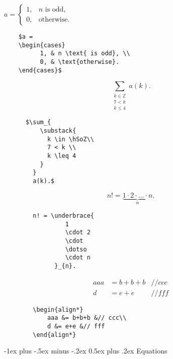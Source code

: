 \documentclass[a4paper,10pt,landscape]{article}
\makeatletter
\renewcommand{\section}{\@startsection{section}{1}{0mm}%
	                                {-1ex plus -.5ex minus -.2ex}%
	                                {0.5ex plus .2ex}%
	                                {\normalfont\large\bfseries}}
\theoremstyle{definition}
\theoremstyle{remark}
\newcommand{\hSoZ}  {\ensuremath{\mathbb{Z}}}      %
\makeatother
\begin{document}
\begin{multicols}{3}
\begin{multicols}{2}
	$a = 
	\begin{cases}
		1, & n \text{ is odd}, \\
		0, & \text{otherwise}.
	\end{cases}$
\columnbreak
	\begin{verbatim}
	$a = 
	\begin{cases}
		  1, & n \text{ is odd}, \\
		  0, & \text{otherwise}.
	\end{cases}$
	\end{verbatim}
\end{multicols}
\begin{multicols}{2}
	\[\sum_{\substack{k \in \hSoZ\\ 7 < k \\ k \leq 4}} a(k).\]
\columnbreak
	\begin{verbatim}
	  $\sum_{
	      \substack{
	        k \in \hSoZ\\ 
	        7 < k \\ 
	        k \leq 4
	      }
	    } 
	    a(k).$
	\end{verbatim}
\end{multicols}
\begin{multicols}{2}
	\[n! = \underbrace{1 \cdot 2 \cdot \dotso \cdot n}_{n}.\]
\columnbreak
	\begin{verbatim}
		n! = \underbrace{
		         1 
		         \cdot 2 
		         \cdot 
		         \dotso 
		         \cdot n
		      }_{n}.
	\end{verbatim}
\end{multicols}
\begin{multicols}{2}
		\begin{align*}
			aaa &= b+b+b &// ccc\\
			d &= e+e &// fff
		\end{align*}
\columnbreak
	\begin{verbatim}
		\begin{align*}
			aaa &= b+b+b &// ccc\\
			d &= e+e &// fff
		\end{align*}
	\end{verbatim}
\end{multicols}




\section{Equations}


\end{multicols}
\end{document}
